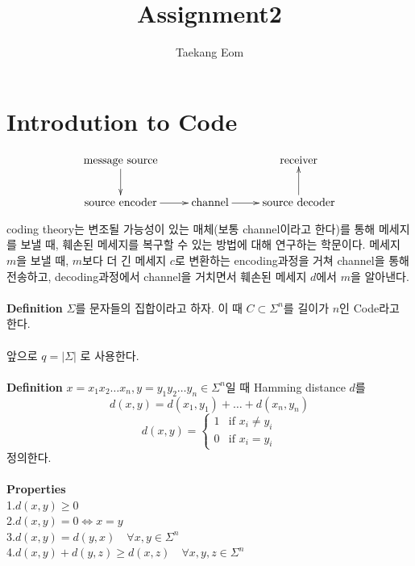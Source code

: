 \documentclass[11pt]{article}
\title{ Assignment2}
\author{Taekang Eom}
\begin{document}
\maketitle
\thispagestyle{empty}

\section{Introdution to Code}
\begin{displaymath}
\xymatrix{ \textrm{message source} \ar[d] & & \textrm{receiver} \\
\textrm{source encoder} \ar[r] & \textrm{channel} \ar[r] & \textrm{source decoder}\ar[u]}
\end{displaymath}

 coding theory는  변조될 가능성이 있는 매체(보통 channel이라고 한다)를 통해 메세지를 보낼 때, 훼손된 메세지를 복구할 수 있는 방법에 대해 연구하는 학문이다. 메세지 $m$을 보낼 때, $m$보다 더 긴 메세지 $c$로 변환하는 encoding과정을 거쳐 channel을 통해 전송하고, decoding과정에서 channel을 거치면서 훼손된 메세지 $d$에서 $m$을 알아낸다.\\\\
{\bf Definition}
 $\Sigma$를 문자들의 집합이라고 하자. 이 때 $C \subset \Sigma^{n}$를 길이가 $n$인 Code라고 한다.\\\\
앞으로 $q=\vert\Sigma\vert$ 로 사용한다.\\\\
{\bf Definition}
$x=x_{1}x_{2}\dots x_{n}, y=y_{1}y_{2}\dots y_{n}\in\Sigma^{n}$일 때 Hamming distance $d$를
\begin{displaymath}
d(x,y) = d(x_{1},y_{1})+\dots+d(x_{n},y_{n})
\end{displaymath}
\begin{displaymath}
d(x,y)= \left\{ \begin{array}{ll}
1 & \textrm{if $x_{i}\neq y_{i}$}\\
0 & \textrm{if $x_{i}=y_{i}$}
\end{array} \right.
\end{displaymath}
 정의한다.\\\\
{\bf Properties}\\
1.$d(x,y)\geq 0$\\
2.$d(x,y)=0\iff x=y$\\
3.$d(x,y)=d(y,x) \quad\forall x,y\in\Sigma^{n}$\\
4.$d(x,y)+d(y,z)\geq d(x,z)\quad \forall x,y,z\in\Sigma^{n}$\\\\
\end{document}
